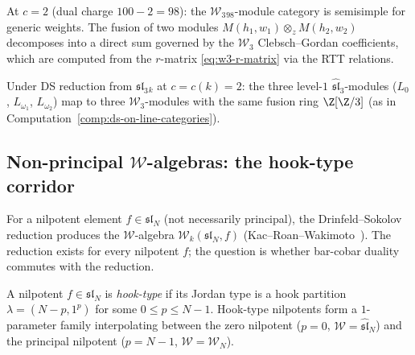\begin{computation}[$\mathcal{W}_3$ fusion rules at $c=2$;
\ClaimStatusConditional]
At $c=2$ (dual charge $100-2=98$): the
$\mathcal{W}_3{}_{98}$-module category is semisimple
for generic weights. The fusion of two modules
$M(h_1,w_1)\otimes_z M(h_2,w_2)$ decomposes into a
direct sum governed by the $\mathcal{W}_3$ Clebsch--Gordan
coefficients, which are computed from the $r$-matrix
\eqref{eq:w3-r-matrix} via the RTT relations.

Under DS reduction from $\widehat{\mathfrak{sl}}_3{}_k$
at $c=c(k)=2$: the three level-$1$
$\widehat{\mathfrak{sl}}_3$-modules ($L_0$,
$L_{\omega_1}$, $L_{\omega_2}$) map to three
$\mathcal{W}_3$-modules with the same fusion ring
$\Z[\Z/3]$ (as in Computation~\ref{comp:ds-on-line-categories}).
\end{computation}

\subsection{Non-principal $\mathcal{W}$-algebras: the hook-type corridor}

\begin{definition}
For a nilpotent element $f\in\mathfrak{sl}_N$ (not
necessarily principal), the Drinfeld--Sokolov reduction
produces the $\mathcal{W}$-algebra
$\mathcal{W}_k(\mathfrak{sl}_N,f)$
(Kac--Roan--Wakimoto~\cite{KRW03}). The reduction
exists for every nilpotent $f$; the question is whether
bar-cobar duality commutes with the reduction.
\end{definition}

\begin{definition}
A nilpotent $f\in\mathfrak{sl}_N$ is \emph{hook-type}
if its Jordan type is a hook partition
$\lambda=(N-p,1^p)$ for some $0\le p\le N-1$.
Hook-type nilpotents form a $1$-parameter family
interpolating between the zero nilpotent ($p=0$,
$\mathcal{W}=\widehat{\mathfrak{sl}}_N$) and the
principal nilpotent ($p=N-1$, $\mathcal{W}=\mathcal{W}_N$).
\end{definition}

